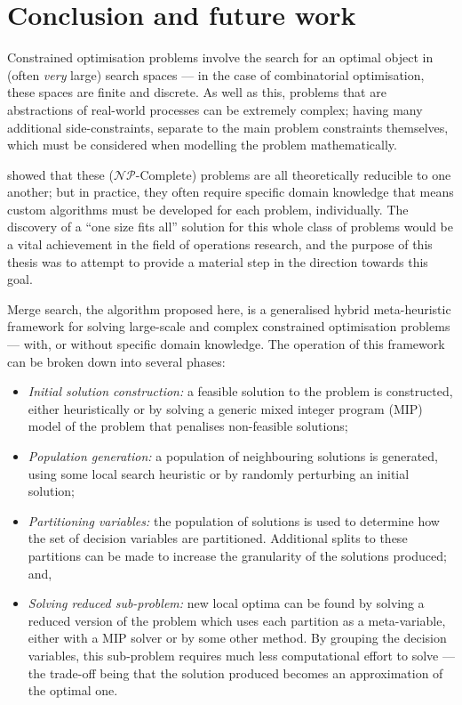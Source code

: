 \documentclass[authoryear,11pt,square,number,times,super,comma]{elsarticle}
\newcommand{\NP}{$\mathcal{NP}$}
\begin{document}
\section{Conclusion and future work}

Constrained optimisation problems involve the search for an optimal object in (often \emph{very} large) search spaces --- in the case of combinatorial optimisation, these spaces are finite and discrete. As well as this, problems that are abstractions of real-world processes can be extremely complex; having many additional side-constraints, separate to the main problem constraints themselves, which must be considered when modelling the problem mathematically.

\cite{np:karp} showed that these (\NP-Complete) problems are all theoretically reducible to one another; but in practice, they often require specific domain knowledge that means custom algorithms must be developed for each problem, individually. The discovery of a ``one size fits all'' solution for this whole class of problems would be a vital achievement in the field of operations research, and the purpose of this thesis was to attempt to provide a material step in the direction towards this goal.

Merge search, the algorithm proposed here, is a generalised hybrid meta-heuristic framework for solving large-scale and complex constrained optimisation problems --- with, or without specific domain knowledge. The operation of this framework can be broken down into several phases:
\begin{itemize}
\item \emph{Initial solution construction:} a feasible solution to the problem is constructed, either heuristically or by solving a generic mixed integer program (MIP) model of the problem that penalises non-feasible solutions;
\item \emph{Population generation:} a population of neighbouring solutions is generated, using some local search heuristic or by randomly perturbing an initial solution;
\item \emph{Partitioning variables:} the population of solutions is used to determine how the set of decision variables are partitioned. Additional splits to these partitions can be made to increase the granularity of the solutions produced; and,
\item \emph{Solving reduced sub-problem:} new local optima can be found by solving a reduced version of the problem which uses each partition as a meta-variable, either with a MIP solver or by some other method. By grouping the decision variables, this sub-problem requires much less computational effort to solve --- the trade-off being that the solution produced becomes an approximation of the optimal one.
\end{itemize}
\end{document}
